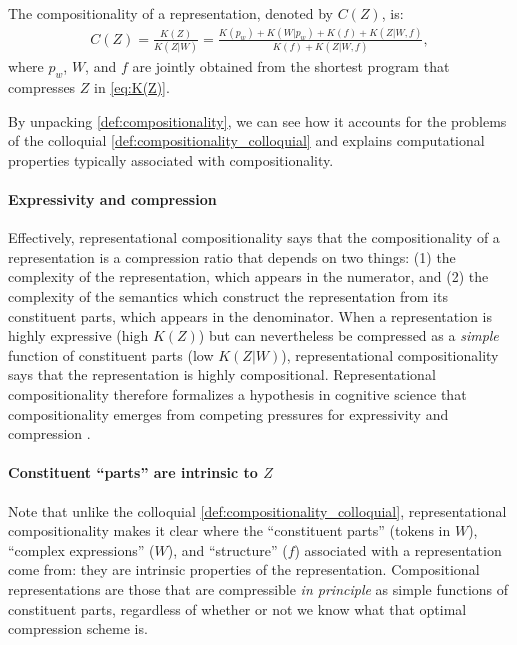 \documentclass{article}
\newcommand{\comp}{representational compositionality}
\newcommand{\Comp}{Representational compositionality}
\begin{document}
\begin{definition}[\Comp{}]
    \label{def:compositionality}
    The compositionality of a representation, denoted by $C(Z)$, is:
    \begin{align}
        \label{eq:C(Z)}
        C(Z) = \frac{K(Z)}{K(Z|W)} = \frac{K(p_w) + K(W|p_w) + K(f) + K(Z|W,f)}{K(f) + K(Z|W,f)} ,
    \end{align}
    where $p_w$, $W$, and $f$ are jointly obtained from the shortest program that compresses $Z$ in \cref{eq:K(Z)}.
\end{definition}

By unpacking \cref{def:compositionality}, we can see how it accounts for the problems of the colloquial \cref{def:compositionality_colloquial} and explains computational properties typically associated with compositionality.

\paragraph{Expressivity and compression}

Effectively, \comp{} says that the compositionality of a representation is a compression ratio that depends on two things: (1) the complexity of the representation, which appears in the numerator, and (2) the complexity of the semantics which construct the representation from its constituent parts, which appears in the denominator. When a representation is highly expressive (high $K(Z)$) but can nevertheless be compressed as a \emph{simple} function of constituent parts (low $K(Z|W)$), \comp{} says that the representation is highly compositional. \Comp{} therefore formalizes a hypothesis in cognitive science that compositionality emerges from competing pressures for expressivity and compression \citep[e.g.,][and references therein]{kirby1999function,kirby2004ug,kirby2008cumulative}.

\paragraph{Constituent ``parts'' are intrinsic to $Z$}

Note that unlike the colloquial \cref{def:compositionality_colloquial}, \comp{} makes it clear where the ``constituent parts'' (tokens in $W$), ``complex expressions'' ($W$), and ``structure'' ($f$) associated with a representation come from: they are intrinsic properties of the representation. Compositional representations are those that are compressible \emph{in principle} as simple functions of constituent parts, regardless of whether or not we know what that optimal compression scheme is.
\end{document}
